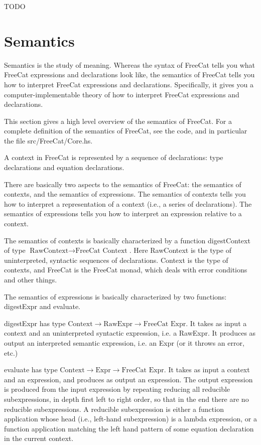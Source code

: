 \documentclass{article}
\begin{document}
TODO

\section{Semantics}

Semantics is the study of meaning. Whereas the syntax of FreeCat tells you what FreeCat expressions and declarations look like, the semantics of FreeCat tells you how to interpret FreeCat expressions and declarations. Specifically, it gives you a computer-implementable theory of how to interpret FreeCat expressions and declarations.

This section gives a high level overview of the semantics of FreeCat. For a complete definition of the semantics of FreeCat, see the code, and in particular the file src/FreeCat/Core.hs.

A context in FreeCat is represented by a sequence of declarations: type declarations and equation declarations.

There are basically two aspects to the semantics of FreeCat: the semantics of contexts, and the semantics of expressions. The semantics of contexts tells you how to interpret a representation of a context (i.e., a series of declarations). The semantics of expressions tells you how to interpret an expression relative to a context.

The semantics of contexts is basically characterized by a function digestContext of type $\text{RawContext} \to \text{FreeCat Context}$. Here RawContext is the type of uninterpreted, syntactic sequences of declarations. Context is the type of contexts, and FreeCat is the FreeCat monad, which deals with error conditions and other things.

The semantics of expressions is basically characterized by two functions: digestExpr and evaluate.

digestExpr has type $\text{Context} \to \text{RawExpr} \to \text{FreeCat Expr}$. It takes as input a context and an uninterpreted syntactic expression, i.e. a RawExpr. It produces as output an interpreted semantic expression, i.e. an Expr (or it throws an error, etc.)

evaluate has type $\text{Context} \to \text{Expr} \to \text{FreeCat Expr}$. It takes as input a context and an expression, and produces as output an expression. The output expression is produced from the input expression by repeating reducing all reducible subexpressions, in depth first left to right order, so that in the end there are no reducible subexpressions. A reducible subexpression is either a function application whose head (i.e., left-hand subexpression) is a lambda expression, or a function application matching the left hand pattern of some equation declaration in the current context.
\end{document}
